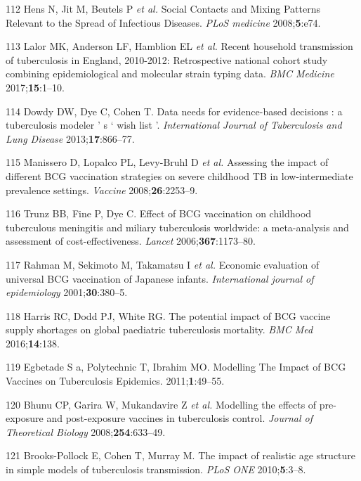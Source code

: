 \documentclass[11pt,twoside]{bristolthesis}
\begin{document}
  \leavevmode\hypertarget{ref-Mossong2008}{}%
  112 Hens N, Jit M, Beutels P \emph{et al.} Social Contacts and Mixing Patterns Relevant to the Spread of Infectious Diseases. \emph{PLoS medicine} 2008;\textbf{5}:e74.
  
  \leavevmode\hypertarget{ref-Lalor2017}{}%
  113 Lalor MK, Anderson LF, Hamblion EL \emph{et al.} Recent household transmission of tuberculosis in England, 2010-2012: Retrospective national cohort study combining epidemiological and molecular strain typing data. \emph{BMC Medicine} 2017;\textbf{15}:1--10.
  
  \leavevmode\hypertarget{ref-Dowdy2012}{}%
  114 Dowdy DW, Dye C, Cohen T. Data needs for evidence-based decisions : a tuberculosis modeler ' s ` wish list '. \emph{International Journal of Tuberculosis and Lung Disease} 2013;\textbf{17}:866--77.
  
  \leavevmode\hypertarget{ref-Manissero2008a}{}%
  115 Manissero D, Lopalco PL, Levy-Bruhl D \emph{et al.} Assessing the impact of different BCG vaccination strategies on severe childhood TB in low-intermediate prevalence settings. \emph{Vaccine} 2008;\textbf{26}:2253--9.
  
  \leavevmode\hypertarget{ref-Trunz2006}{}%
  116 Trunz BB, Fine P, Dye C. Effect of BCG vaccination on childhood tuberculous meningitis and miliary tuberculosis worldwide: a meta-analysis and assessment of cost-effectiveness. \emph{Lancet} 2006;\textbf{367}:1173--80.
  
  \leavevmode\hypertarget{ref-Rahman2001a}{}%
  117 Rahman M, Sekimoto M, Takamatsu I \emph{et al.} Economic evaluation of universal BCG vaccination of Japanese infants. \emph{International journal of epidemiology} 2001;\textbf{30}:380--5.
  
  \leavevmode\hypertarget{ref-Harris2016}{}%
  118 Harris RC, Dodd PJ, White RG. The potential impact of BCG vaccine supply shortages on global paediatric tuberculosis mortality. \emph{BMC Med} 2016;\textbf{14}:138.
  
  \leavevmode\hypertarget{ref-Egbetade2011a}{}%
  119 Egbetade S a, Polytechnic T, Ibrahim MO. Modelling The Impact of BCG Vaccines on Tuberculosis Epidemics. 2011;\textbf{1}:49--55.
  
  \leavevmode\hypertarget{ref-Bhunu2008b}{}%
  120 Bhunu CP, Garira W, Mukandavire Z \emph{et al.} Modelling the effects of pre-exposure and post-exposure vaccines in tuberculosis control. \emph{Journal of Theoretical Biology} 2008;\textbf{254}:633--49.
  
  \leavevmode\hypertarget{ref-Brooks-Pollock2010}{}%
  121 Brooks-Pollock E, Cohen T, Murray M. The impact of realistic age structure in simple models of tuberculosis transmission. \emph{PLoS ONE} 2010;\textbf{5}:3--8.
  
\end{document}
